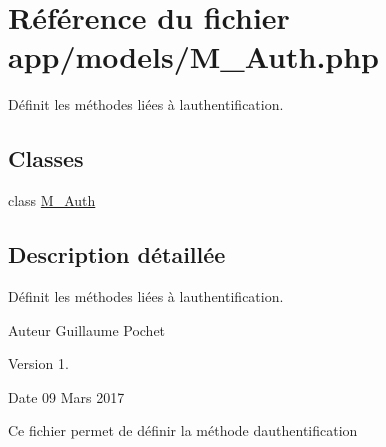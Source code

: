 \hypertarget{_m___auth_8php}{}\section{Référence du fichier app/models/\+M\+\_\+\+Auth.php}
\label{_m___auth_8php}


Définit les méthodes liées à l\textquotesingle{}authentification.  


\subsection*{Classes}
\begin{DoxyCompactItemize}
\item 
class \hyperlink{class_m___auth}{M\+\_\+\+Auth}
\end{DoxyCompactItemize}


\subsection{Description détaillée}
Définit les méthodes liées à l\textquotesingle{}authentification. 

\begin{DoxyAuthor}{Auteur}
Guillaume Pochet 
\end{DoxyAuthor}
\begin{DoxyVersion}{Version}
1. 
\end{DoxyVersion}
\begin{DoxyDate}{Date}
09 Mars 2017
\end{DoxyDate}
Ce fichier permet de définir la méthode d\textquotesingle{}authentification 